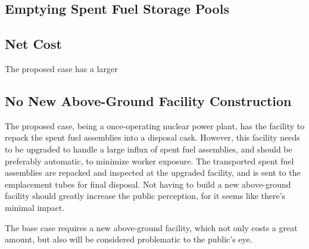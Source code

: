 \documentclass{anstrans}
\begin{document}
\subsection{Emptying Spent Fuel Storage Pools }


\subsection{Net Cost}
The proposed case has a larger 

\subsection{No New Above-Ground Facility Construction}
The proposed case, being a once-operating nuclear power plant, has the facility to 
repack the spent fuel assemblies into a disposal cask. However, this facility needs 
to be upgraded to handle a large influx of spent fuel assemblies, and should be
preferably automatic, to minimize worker exposure. The transported spent fuel
assemblies are repacked and inspected at the upgraded facility, and is sent to the
emplacement tubes for final disposal. Not having to build a new above-ground facility
should greatly increase the public perception, for it seems like there's minimal
impact.

The base case requires a new above-ground facility, which not only costs a great
amount, but also will be considered problematic to the public's eye. 




\end{document}
